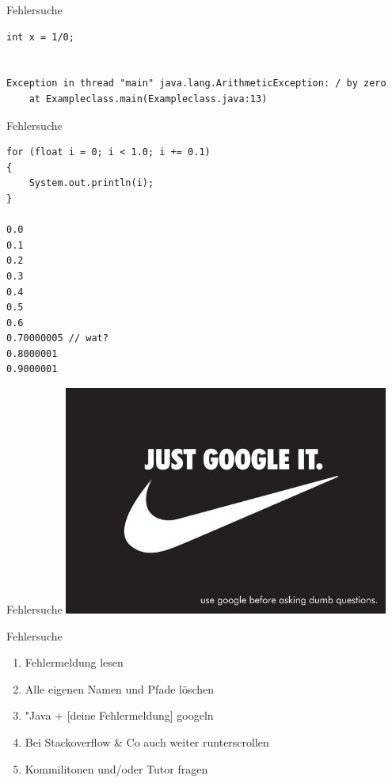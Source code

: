 \documentclass{beamer}
\begin{document}
\begin{frame}[fragile]{Fehlersuche}
  \begin{lstlisting}
int x = 1/0;


Exception in thread "main" java.lang.ArithmeticException: / by zero
    at Exampleclass.main(Exampleclass.java:13)
  \end{lstlisting}
\end{frame}

\begin{frame}[fragile]{Fehlersuche}
  \begin{lstlisting}
for (float i = 0; i < 1.0; i += 0.1)
{
    System.out.println(i);
}

0.0
0.1
0.2
0.3
0.4
0.5
0.6
0.70000005 // wat?
0.8000001
0.9000001
  \end{lstlisting}
\end{frame}

\begin{frame}{Fehlersuche}
  \centering
  \includegraphics[width=0.8\textwidth]{img/justgoogle.jpg}
\end{frame}

\begin{frame}{Fehlersuche}
  \begin{enumerate}
  \item Fehlermeldung lesen
  \item Alle eigenen Namen und Pfade löschen
  \item "Java + [deine Fehlermeldung] googeln
  \item Bei Stackoverflow \& Co auch weiter runterscrollen
  \item Kommilitonen und/oder Tutor fragen
  \end{enumerate}
\end{frame}
\end{document}
